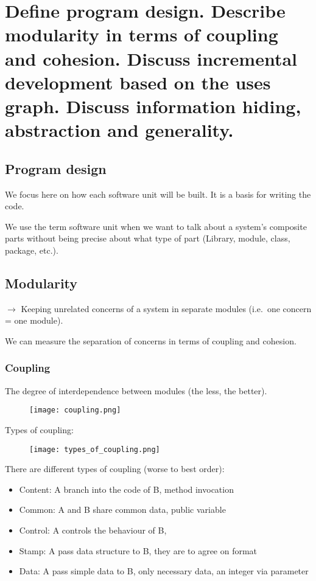 \clearpage{}
\section{Define program design. Describe modularity in terms of coupling
and cohesion. Discuss incremental development based on the uses graph.
Discuss information hiding, abstraction and generality.}

\subsection{Program design}

We focus here on how each software unit will be built. It is a basis for writing the code. \newline

We use the term software unit when we want to talk about a system’s composite parts
without being precise about what type of part (Library, module, class, package, etc.).

\subsection{Modularity}

$\rightarrow$ Keeping unrelated concerns of a system in separate modules (i.e.\ one concern = one
module). \newline

We can measure the separation of concerns in terms of coupling and cohesion. \newline

\subsubsection{Coupling}

The degree of interdependence between modules (the less, the better).

\begin{figure}[!ht]
    \centering
    \texttt{[image: coupling.png]}
\end{figure}

Types of coupling:
\begin{figure}[!ht]
    \centering
    \texttt{[image: types\_of\_coupling.png]}
\end{figure}

There are different types of coupling (worse to best order):
\begin{itemize}
    \item Content: A branch into the code of B, method invocation
    \item Common: A and B share common data, public variable
    \item Control: A controls the behaviour of B, 
    \item Stamp: A pass data structure to B, they are to agree on format
    \item Data: A pass simple data to B, only necessary data, an integer via parameter
\end{itemize}

